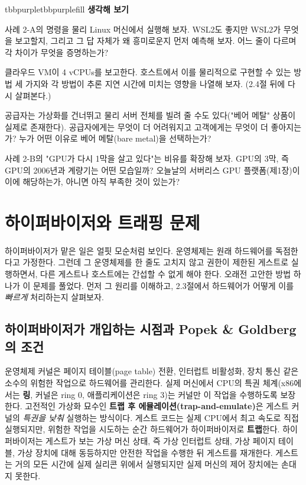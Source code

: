 \begin{calloutbox}{tbbpurple}{tbbpurplefill}
{\normalsize\bfseries\color{tbbpurple}생각해 보기}\par\vspace{3pt}
\begin{tbbitemize}
  \item 사례 2-A의 명령을 물리 Linux 머신에서 실행해 보자. WSL2도 좋지만 WSL2가 무엇을 보고할지, 그리고 그 답 자체가 왜 흥미로운지 먼저 예측해 보자. 어느 줄이 다르며 각 차이가 무엇을 증명하는가?
  \item 클라우드 VM이 4 vCPUs를 보고한다. 호스트에서 이를 물리적으로 구현할 수 있는 방법 세 가지와 각 방법이 추론 지연 시간에 미치는 영향을 나열해 보자. (2.4절 뒤에 다시 살펴본다.)
  \item 공급자는 가상화를 건너뛰고 물리 서버 전체를 빌려 줄 수도 있다("베어 메탈" 상품이 실제로 존재한다). 공급자에게는 무엇이 더 어려워지고 고객에게는 무엇이 더 좋아지는가? 누가 어떤 이유로 베어 메탈(bare metal)을 선택하는가?
  \item 사례 2-B의 "GPU가 다시 1막을 살고 있다"는 비유를 확장해 보자. GPU의 3막, 즉 GPU의 2006년과 계량기는 어떤 모습일까? 오늘날의 서버리스 GPU 플랫폼(제1장)이 이에 해당하는가, 아니면 아직 부족한 것이 있는가?
\end{tbbitemize}
\end{calloutbox}

\section{하이퍼바이저와 트래핑 문제}

하이퍼바이저가 맡은 일은 얼핏 모순처럼 보인다. 운영체제는 원래 하드웨어를 독점한다고 가정한다. 그런데 그 운영체제를 한 줄도 고치지 않고 권한이 제한된 게스트로 실행하면서, 다른 게스트나 호스트에는 간섭할 수 없게 해야 한다. 오래전 고안한 방법 하나가 이 문제를 풀었다. 먼저 그 원리를 이해하고, 2.3절에서 하드웨어가 어떻게 이를 \textit{빠르게} 처리하는지 살펴보자.

\subsection*{하이퍼바이저가 개입하는 시점과 Popek \& Goldberg의 조건}

운영체제 커널은 페이지 테이블(page table) 전환, 인터럽트 비활성화, 장치 통신 같은 소수의 위험한 작업으로 하드웨어를 관리한다. 실제 머신에서 CPU의 특권 체계(x86에서는 \textbf{링}, 커널은 ring 0, 애플리케이션은 ring 3)는 커널만 이 작업을 수행하도록 보장한다. 고전적인 가상화 묘수인 \textbf{트랩 후 에뮬레이션(trap-and-emulate)}은 게스트 커널의 \textit{특권을 낮춰} 실행하는 방식이다. 게스트 코드는 실제 CPU에서 최고 속도로 직접 실행되지만, 위험한 작업을 시도하는 순간 하드웨어가 하이퍼바이저로 \textbf{트랩}한다. 하이퍼바이저는 게스트가 보는 가상 머신 상태, 즉 가상 인터럽트 상태, 가상 페이지 테이블, 가상 장치에 대해 동등하지만 안전한 작업을 수행한 뒤 게스트를 재개한다. 게스트는 거의 모든 시간에 실제 실리콘 위에서 실행되지만 실제 머신의 제어 장치에는 손대지 못한다.

